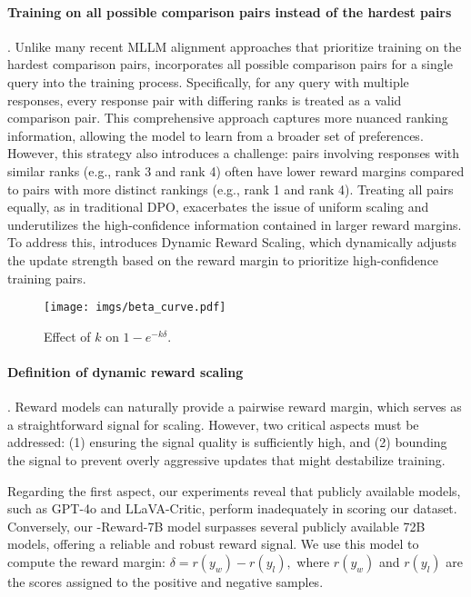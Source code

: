 \paragraph{Training on all possible comparison pairs instead of the hardest pairs}.  
Unlike many recent MLLM alignment approaches that prioritize training on the hardest comparison pairs, \dpo incorporates all possible comparison pairs for a single query into the training process. Specifically, for any query with multiple responses, every response pair with differing ranks is treated as a valid comparison pair. This comprehensive approach captures more nuanced ranking information, allowing the model to learn from a broader set of preferences. However, this strategy also introduces a challenge: pairs involving responses with similar ranks (e.g., rank 3 and rank 4) often have lower reward margins compared to pairs with more distinct rankings (e.g., rank 1 and rank 4). Treating all pairs equally, as in traditional DPO, exacerbates the issue of uniform scaling and underutilizes the high-confidence information contained in larger reward margins. To address this, \dpo introduces Dynamic Reward Scaling, which dynamically adjusts the update strength based on the reward margin to prioritize high-confidence training pairs.

\begin{wrapfigure}{r}{0.34\linewidth}
\vspace{-0.7cm}
  \begin{center}
    \texttt{[image: imgs/beta\_curve.pdf]}
\vspace{-0.4cm}
\caption{Effect of $k$ on $1 - e^{-k \delta}$.}
\label{fig:beta_func}
\end{center}
\vspace{-0.4cm}
\end{wrapfigure}
\paragraph{Definition of dynamic reward scaling}. Reward models can naturally provide a pairwise reward margin, which serves as a straightforward signal for scaling. However, two critical aspects must be addressed: (1) ensuring the signal quality is sufficiently high, and (2) bounding the signal to prevent overly aggressive updates that might destabilize training.


Regarding the first aspect, our experiments reveal that publicly available models, such as GPT-4o and LLaVA-Critic, perform inadequately in scoring our dataset. Conversely, our \abbr-Reward-7B model surpasses several publicly available 72B models, offering a reliable and robust reward signal. We use this model to compute the reward margin: 
 $\delta = r(y_w) - r(y_l),$
where $r(y_w)$ and $r(y_l)$ are the scores assigned to the positive and negative samples.

